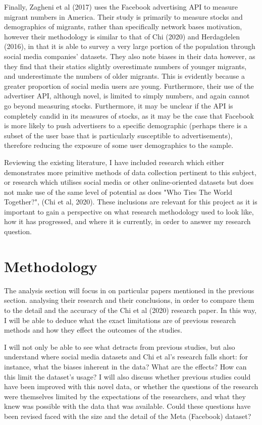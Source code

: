 \documentclass[12pt]{article}
\begin{document}
Finally, Zagheni et al (2017) uses the Facebook advertising API to measure migrant numbers 
in America. Their study is primarily to measure stocks and demographics of migrants, 
rather than specifically network bases motivation, however their methodology is similar to 
that of Chi (2020) and Herdagdelen (2016), in that it is able to survey a very large portion of 
the population through social media companies' datasets. They also note biases in their data 
however, as they find that their statics slightly overestimate numbers of younger 
migrants, and underestimate the numbers of older migrants. This is evidently because a 
greater proportion of social media users are young. Furthermore, their use of the advertiser 
API, although novel, is limited to simply numbers, and again cannot go beyond measuring stocks. 
Furthermore, it may be unclear if the API is completely candid in its measures of stocks, 
as it may be the case that Facebook is more likely to push advertisers to a 
specific demographic (perhaps there is a subset of the user base that is particularly susceptible 
to advertisements), therefore reducing the 
exposure of some user demographics to the sample.

Reviewing the existing literature, I have included research which either demonstrates more 
primitive methods of data collection pertinent to this subject, or research which 
utilises social media or other online-oriented datasets but does not make use of the 
same level of potential as does "Who Ties The World Together?", (Chi et al, 2020). These 
inclusions are relevant for this project as it is important to gain a perspective on 
what research methodology used to look like, how it has progressed, and where it is currently,
in order to answer my research question.

\section{Methodology}

The analysis section will focus in on particular papers mentioned in the previous section. 
analysing their research and their conclusions, in order to compare them to the 
detail and the accuracy of the Chi et al (2020) research paper. In this way, I will be 
able to deduce what the exact limitations are of previous research methods and how they 
effect the outcomes of the studies. 

I will not only be able to see what detracts from previous studies, but also understand 
where social media datasets and Chi et al's research falls short: for instance, what 
the biases inherent in the data? What are the effects? How can this limit the dataset's usage?
I will also discuss whether previous studies could have been improved with this novel 
data, or whether the questions of the research were themselves limited by the expectations
of the researchers, and what they knew was possible with the data that was available. Could 
these questions have been revised faced with the size and the detail of the Meta (Facebook) dataset?
\end{document}
